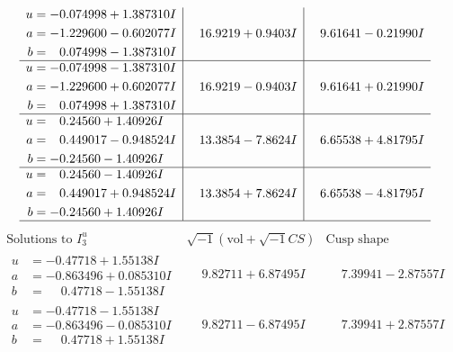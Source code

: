 \documentclass[1p]{elsarticle_modified}
\theoremstyle{definition}
\newcommand{\I}{\sqrt{-1}}
\begin{document}
$$\begin{array}{c|c|c}
\begin{aligned}
u &= -0.074998 + 1.387310 I \\
a &= -1.229600 - 0.602077 I \\
b &= \phantom{-}0.074998 - 1.387310 I\end{aligned}
 & \phantom{-}16.9219 + 0.9403 I & \phantom{-}9.61641 - 0.21990 I \\ \hline\begin{aligned}
u &= -0.074998 - 1.387310 I \\
a &= -1.229600 + 0.602077 I \\
b &= \phantom{-}0.074998 + 1.387310 I\end{aligned}
 & \phantom{-}16.9219 - 0.9403 I & \phantom{-}9.61641 + 0.21990 I \\ \hline\begin{aligned}
u &= \phantom{-}0.24560 + 1.40926 I \\
a &= \phantom{-}0.449017 - 0.948524 I \\
b &= -0.24560 - 1.40926 I\end{aligned}
 & \phantom{-}13.3854 - 7.8624 I & \phantom{-}6.65538 + 4.81795 I \\ \hline\begin{aligned}
u &= \phantom{-}0.24560 - 1.40926 I \\
a &= \phantom{-}0.449017 + 0.948524 I \\
b &= -0.24560 + 1.40926 I\end{aligned}
 & \phantom{-}13.3854 + 7.8624 I & \phantom{-}6.65538 - 4.81795 I\\
 \hline 
 \end{array}$$\newpage$$\begin{array}{c|c|c}  
\text{Solutions to }I^u_{3}& \I (\text{vol} + \sqrt{-1}CS) & \text{Cusp shape}\\
 \hline 
\begin{aligned}
u &= -0.47718 + 1.55138 I \\
a &= -0.863496 + 0.085310 I \\
b &= \phantom{-}0.47718 - 1.55138 I\end{aligned}
 & \phantom{-}9.82711 + 6.87495 I & \phantom{-}7.39941 - 2.87557 I \\ \hline\begin{aligned}
u &= -0.47718 - 1.55138 I \\
a &= -0.863496 - 0.085310 I \\
b &= \phantom{-}0.47718 + 1.55138 I\end{aligned}
 & \phantom{-}9.82711 - 6.87495 I & \phantom{-}7.39941 + 2.87557 I \\ \hline\begin{aligned}

\end{aligned}
\end{array}$$
\end{document}

